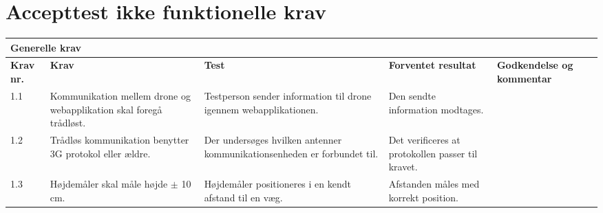 \section{Accepttest ikke funktionelle krav}

\begin{sideways}
    \centering
    \begin{tabular}{|l|p{4.5 cm}|p{4.5 cm}|p{4.5 cm}|p{4.5 cm}|p{2 cm}|}
			\hline
			\multicolumn{5}{|l|}{\textbf{Generelle krav}}\\ \hline
			\textbf{Krav nr.} & \textbf{Krav} & \textbf{Test} & \textbf{Forventet \newline resultat} & 			
			\textbf{Godkendelse \newline og kommentar} \\ \hline
			
			1.1 & Kommunikation mellem drone og webapplikation skal foregå trådløst.
				& Testperson sender information til drone igennem webapplikationen.
				& Den sendte information modtages.
				& \\ \hline

			1.2 & Trådløs kommunikation benytter 3G protokol eller ældre. 
				& Der undersøges hvilken antenner kommunikationsenheden er forbundet til.
				& Det verificeres at protokollen passer til kravet.
				&  \\ \hline
			
			1.3 & Højdemåler skal måle højde $\pm$ 10 cm.
				& Højdemåler positioneres i en kendt afstand til en væg.
				& Afstanden måles med korrekt position.
				& \\ \hline						
		\end{tabular}
\end{sideways}

